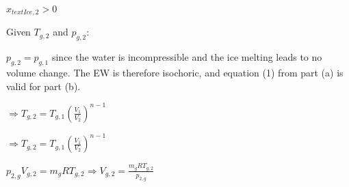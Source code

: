 \( x_{text{Ice},2} > 0 \)  

Given \( T_{g,2} \) and \( p_{g,2} \):  

\( p_{g,2} = p_{g,1} \) since the water is incompressible and the ice melting leads to no volume change. The EW is therefore isochoric, and equation (1) from part (a) is valid for part (b).  

\( \Rightarrow T_{g,2} = T_{g,1} \left(\frac{V_{1}}{V_{2}}\right)^{n-1} \)  

\( \Rightarrow T_{g,2} = T_{g,1} \left(\frac{V_{1}}{V_{2}}\right)^{n-1} \)  

\( p_{2,g} V_{g,2} = m_{g} R T_{g,2} \Rightarrow V_{g,2} = \frac{m_{g} R T_{g,2}}{p_{2,g}} \)